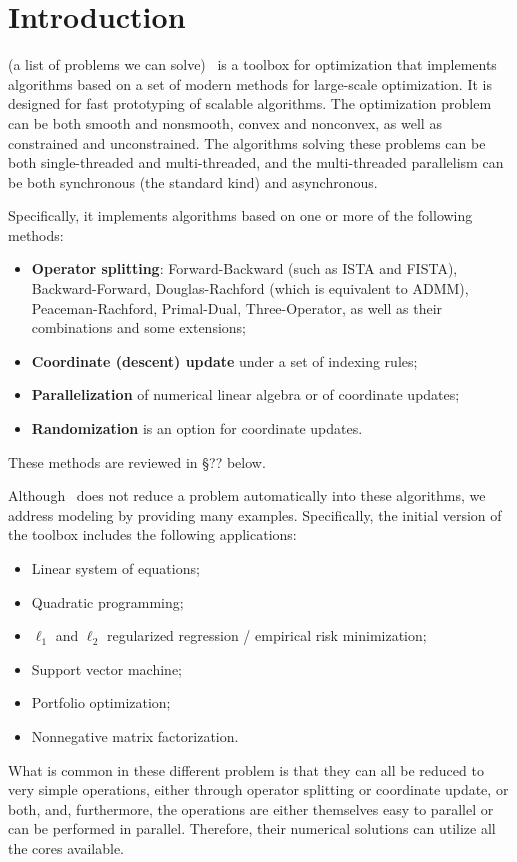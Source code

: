 \section{Introduction}
(a list of problems we can solve)
\pkg~is a toolbox for optimization that implements algorithms based on a set of modern methods for large-scale optimization. It is designed for fast prototyping of scalable algorithms. The optimization problem can be both smooth and nonsmooth, convex and nonconvex, as well as constrained and unconstrained.  The algorithms solving these problems can be both single-threaded and multi-threaded, and the multi-threaded parallelism can be both synchronous (the standard kind) and asynchronous.  

Specifically, it implements  algorithms based on one or more of the following methods:
\begin{itemize}
\item \textbf{Operator splitting}: Forward-Backward (such as ISTA and FISTA), Backward-Forward, Douglas-Rachford  (which is equivalent to ADMM), Peaceman-Rachford, Primal-Dual, Three-Operator, as well as their combinations and some extensions;
\item \textbf{Coordinate (descent) update} under a set of indexing rules;
\item \textbf{Parallelization} of numerical linear algebra or of coordinate updates;
\item  \textbf{Randomization} is an option for coordinate updates.
\end{itemize}
These methods are reviewed in \S?? below.

Although \pkg~does not reduce a problem automatically into these algorithms, we address modeling by  providing many examples. Specifically, the initial version of the toolbox includes the following applications:
\begin{itemize}
\item Linear system of equations;
\item Quadratic programming;
\item $\ell_1$ and $\ell_2$ regularized  regression / empirical risk minimization;
\item Support vector machine;
\item Portfolio optimization;
\item Nonnegative matrix factorization.
\end{itemize}
What is common in these different problem is that they can all be reduced to very simple operations, either through operator splitting or coordinate update, or both, and, furthermore, the operations are either themselves easy to parallel or can be performed in parallel. Therefore, their numerical solutions can utilize all the cores available.

